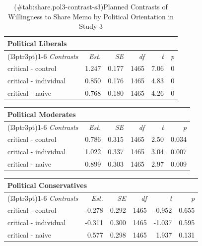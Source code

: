 \documentclass[
]{book}
\begin{document}
\begin{table}

\caption{(\#tab:share.pol3-contrast-s3)Planned Contrasts of Willingness to Share Memo by Political Orientation in Study 3}
\centering
\fontsize{13}{15}\selectfont
\begin{tabular}[t]{lrrrrr}
\toprule
\multicolumn{6}{l}{Political Liberals} \\
\cmidrule(l{3pt}r{3pt}){1-6}
\em{Contrasts} & \em{Est.} & \em{SE} & \em{df} & \em{t} & \em{p}\\
\midrule
critical - control & 1.247 & 0.177 & 1465 & 7.06 & 0\\
critical - individual & 0.850 & 0.176 & 1465 & 4.83 & 0\\
critical - naive & 0.768 & 0.180 & 1465 & 4.26 & 0\\
\bottomrule
\end{tabular}
\end{table}

\begin{table}
\centering
\fontsize{13}{15}\selectfont
\begin{tabular}{lrrrrr}
\toprule
\multicolumn{6}{l}{Political Moderates} \\
\cmidrule(l{3pt}r{3pt}){1-6}
\em{Contrasts} & \em{Est.} & \em{SE} & \em{df} & \em{t} & \em{p}\\
\midrule
critical - control & 0.786 & 0.315 & 1465 & 2.50 & 0.034\\
critical - individual & 1.022 & 0.337 & 1465 & 3.04 & 0.007\\
critical - naive & 0.899 & 0.303 & 1465 & 2.97 & 0.009\\
\bottomrule
\end{tabular}
\end{table}

\begin{table}
\centering
\fontsize{13}{15}\selectfont
\begin{tabular}{lrrrrr}
\toprule
\multicolumn{6}{l}{Political Conservatives} \\
\cmidrule(l{3pt}r{3pt}){1-6}
\em{Contrasts} & \em{Est.} & \em{SE} & \em{df} & \em{t} & \em{p}\\
\midrule
critical - control & -0.278 & 0.292 & 1465 & -0.952 & 0.655\\
critical - individual & -0.311 & 0.300 & 1465 & -1.037 & 0.595\\
critical - naive & 0.577 & 0.298 & 1465 & 1.937 & 0.131\\
\bottomrule
\end{tabular}
\end{table}
\end{document}
